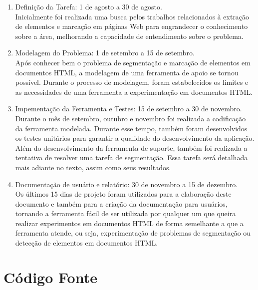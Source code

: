 \documentclass[12pt, a4paper]{article}
\begin{document}
\begin{enumerate}
\item Definição da Tarefa: 1 de agosto a 30 de agosto. \\
Inicialmente foi realizada uma busca pelos trabalhos relacionados à
extração de elementos e marcação em páginas Web para engrandecer o
conhecimento sobre a área, melhorando a capacidade de entendimento
sobre o problema.

\item Modelagem do Problema: 1 de setembro a 15 de setembro. \\ 
Após conhecer bem o problema de segmentação e marcação de elementos em
documentos HTML, a modelagem de uma ferramenta de apoio se tornou possível.
Durante o processo de modelagem, foram estabelecidos os limites e as
necessidades de uma ferramenta a experimentação em documentos HTML.

\item Impementação da Ferramenta e Testes: 15 de setembro a 30 de
novembro. \\
Durante o mês de setembro, outubro e novembro foi realizada a
codificação da ferramenta modelada. Durante esse tempo, também foram
desenvolvidos os testes unitários para garantir a qualidade do
desenvolvimento da aplicação. Além do desenvolvimento da ferramenta de
suporte, também foi realizada a tentativa de resolver uma tarefa de
segmentação. Essa tarefa será detalhada mais adiante no texto, assim como
seus resultados.

\item Documentação de usuário e relatório: 30 de novembro a 15 de
dezembro. \\
Os últimos 15 dias de projeto foram utilizados para a elaboração deste
documento e também para a criação da documentação para usuários,
tornando a ferramenta fácil de ser utilizada por qualquer um que
queira realizar experimentos em documentos HTML de forma semelhante a
que a ferramenta atende, ou seja, experimentação de problemas de
segmentação ou detecção de elementos em documentos HTML.
\end{enumerate}

\section{Código Fonte}

\end{document}
